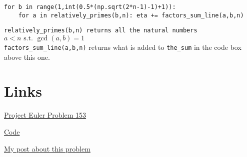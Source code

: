 \documentclass[11pt]{article}
\newcommand{\st}{\text{ s.t. }}
\begin{document}

\begin{lstlisting}
for b in range(1,int(0.5*(np.sqrt(2*n-1)-1)+1)):
    for a in relatively_primes(b,n): eta += factors_sum_line(a,b,n)
\end{lstlisting}
\texttt{relatively\_primes(b,n) returns all the natural numbers $a<n\st \gcd(a,b)=1$}\\
\texttt{factors\_sum\_line(a,b,n)} returns what is added to \texttt{the\_sum} in the code box above this one.







\section{Links}

\begin{itmemize}
\item \href{https://projecteuler.net/problem=153}{Project Euler Problem 153}
\item \href{https://github.com/dcxSt/project-euler/blob/master/problem\%20153\%20gaussian\%20integers/problem153.py}{Code}
\item \href{https://dcxst.github.io//2019/07/19/prject-euler-problem-153.html}{My post about this problem}

\end{itmemize}
\end{document}
